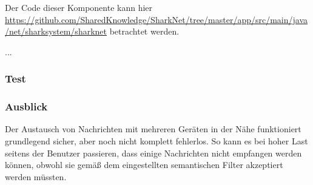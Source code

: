 Der Code dieser Komponente kann hier \url{https://github.com/SharedKnowledge/SharkNet/tree/master/app/src/main/java/net/sharksystem/sharknet} betrachtet werden. 

...


\subsubsection{Test}



\subsubsection{Ausblick}
Der Austausch von Nachrichten mit mehreren Geräten in der Nähe funktioniert grundlegend sicher, aber noch nicht komplett fehlerlos. So kann es bei hoher Last seitens der Benutzer passieren, dass einige Nachrichten nicht empfangen werden können, obwohl sie gemäß dem eingestellten semantischen Filter akzeptiert werden müssten. 
\newpage